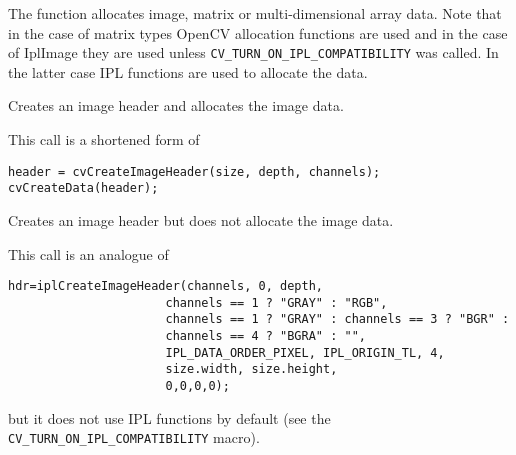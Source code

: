 \begin{description}
\end{description}


The function allocates image, matrix or
multi-dimensional array data. Note that in the case of matrix types OpenCV
allocation functions are used and in the case of IplImage they are used
unless \texttt{CV\_TURN\_ON\_IPL\_COMPATIBILITY} was called. In the
latter case IPL functions are used to allocate the data.

Creates an image header and allocates the image data.


\begin{description}
\end{description}

\ifC
This call is a shortened form of
\begin{lstlisting}
header = cvCreateImageHeader(size, depth, channels);
cvCreateData(header);
\end{lstlisting}
\fi

Creates an image header but does not allocate the image data.


\begin{description}
\end{description}

\ifC
This call is an analogue of
\begin{lstlisting}
hdr=iplCreateImageHeader(channels, 0, depth,
                      channels == 1 ? "GRAY" : "RGB",
                      channels == 1 ? "GRAY" : channels == 3 ? "BGR" :
                      channels == 4 ? "BGRA" : "",
                      IPL_DATA_ORDER_PIXEL, IPL_ORIGIN_TL, 4,
                      size.width, size.height,
                      0,0,0,0);
\end{lstlisting}
but it does not use IPL functions by default (see the \texttt{CV\_TURN\_ON\_IPL\_COMPATIBILITY} macro).
\fi

